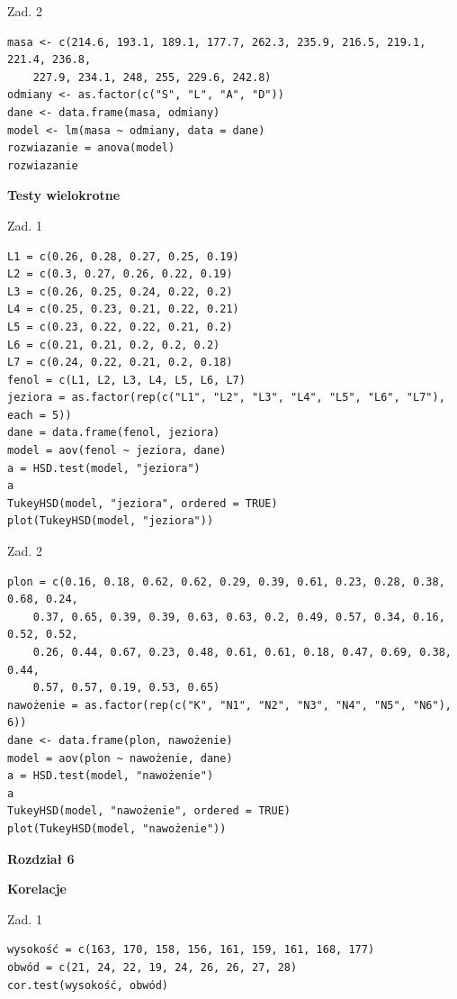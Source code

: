 \documentclass[12pt,B5paper,]{book}
\begin{document}
Zad. 2

\begin{verbatim}
masa <- c(214.6, 193.1, 189.1, 177.7, 262.3, 235.9, 216.5, 219.1, 221.4, 236.8, 
    227.9, 234.1, 248, 255, 229.6, 242.8)
odmiany <- as.factor(c("S", "L", "A", "D"))
dane <- data.frame(masa, odmiany)
model <- lm(masa ~ odmiany, data = dane)
rozwiazanie = anova(model)
rozwiazanie
\end{verbatim}

\vspace{0.8cm} \textbf{Testy wielokrotne}

Zad. 1

\begin{verbatim}
L1 = c(0.26, 0.28, 0.27, 0.25, 0.19)
L2 = c(0.3, 0.27, 0.26, 0.22, 0.19)
L3 = c(0.26, 0.25, 0.24, 0.22, 0.2)
L4 = c(0.25, 0.23, 0.21, 0.22, 0.21)
L5 = c(0.23, 0.22, 0.22, 0.21, 0.2)
L6 = c(0.21, 0.21, 0.2, 0.2, 0.2)
L7 = c(0.24, 0.22, 0.21, 0.2, 0.18)
fenol = c(L1, L2, L3, L4, L5, L6, L7)
jeziora = as.factor(rep(c("L1", "L2", "L3", "L4", "L5", "L6", "L7"), each = 5))
dane = data.frame(fenol, jeziora)
model = aov(fenol ~ jeziora, dane)
a = HSD.test(model, "jeziora")
a
TukeyHSD(model, "jeziora", ordered = TRUE)
plot(TukeyHSD(model, "jeziora"))
\end{verbatim}

Zad. 2

\begin{verbatim}
plon = c(0.16, 0.18, 0.62, 0.62, 0.29, 0.39, 0.61, 0.23, 0.28, 0.38, 0.68, 0.24, 
    0.37, 0.65, 0.39, 0.39, 0.63, 0.63, 0.2, 0.49, 0.57, 0.34, 0.16, 0.52, 0.52, 
    0.26, 0.44, 0.67, 0.23, 0.48, 0.61, 0.61, 0.18, 0.47, 0.69, 0.38, 0.44, 
    0.57, 0.57, 0.19, 0.53, 0.65)
nawożenie = as.factor(rep(c("K", "N1", "N2", "N3", "N4", "N5", "N6"), 6))
dane <- data.frame(plon, nawożenie)
model = aov(plon ~ nawożenie, dane)
a = HSD.test(model, "nawożenie")
a
TukeyHSD(model, "nawożenie", ordered = TRUE)
plot(TukeyHSD(model, "nawożenie"))
\end{verbatim}

\vspace{0.8cm} \textbf{Rozdział 6} \vspace{0.8cm}

\textbf{Korelacje}

Zad. 1

\begin{verbatim}
wysokość = c(163, 170, 158, 156, 161, 159, 161, 168, 177)
obwód = c(21, 24, 22, 19, 24, 26, 26, 27, 28)
cor.test(wysokość, obwód)
\end{verbatim}
\end{document}
